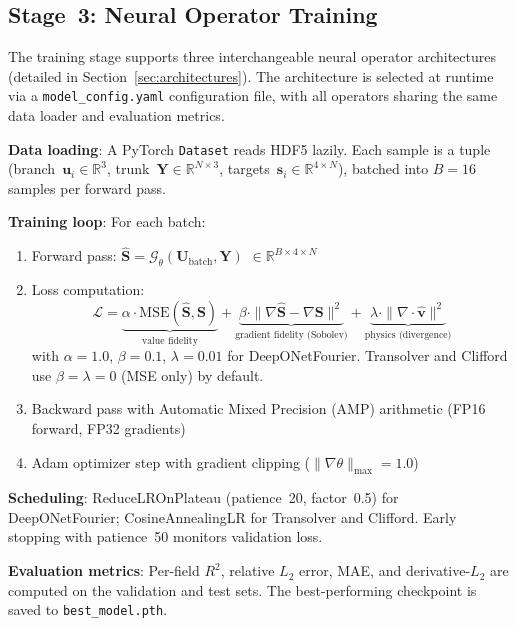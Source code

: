 \documentclass[journal]{IEEEtran}
\begin{document}
\subsection{Stage~3: Neural Operator Training}

The training stage supports three interchangeable neural operator architectures (detailed in Section~\ref{sec:architectures}). The architecture is selected at runtime via a \texttt{model\_config.yaml} configuration file, with all operators sharing the same data loader and evaluation metrics.

\textbf{Data loading}: A PyTorch \texttt{Dataset} reads HDF5 lazily. Each sample is a tuple (branch~$\bm{u}_i \in \mathbb{R}^3$, trunk~$\bm{Y} \in \mathbb{R}^{N \times 3}$, targets~$\bm{s}_i \in \mathbb{R}^{4 \times N}$), batched into $B = 16$ samples per forward pass.

\textbf{Training loop}: For each batch:
\begin{enumerate}
    \item Forward pass: $\hat{\bm{S}} = \mathcal{G}_\theta(\bm{U}_\text{batch}, \bm{Y})$ $\in \mathbb{R}^{B \times 4 \times N}$
    \item Loss computation:
    \begin{equation}
    \mathcal{L} = \underbrace{\alpha \cdot \text{MSE}(\hat{\bm{S}}, \bm{S})}_{\text{value fidelity}} + \underbrace{\beta \cdot \|\nabla\hat{\bm{S}} - \nabla\bm{S}\|^2}_{\text{gradient fidelity (Sobolev)}} + \underbrace{\lambda \cdot \|{\nabla \!\cdot\! \hat{\bm{v}}}\|^2}_{\text{physics (divergence)}}
    \label{eq:total_loss}
    \end{equation}
    with $\alpha = 1.0$, $\beta = 0.1$, $\lambda = 0.01$ for DeepONetFourier. Transolver and Clifford use $\beta = \lambda = 0$ (MSE only) by default.
    \item Backward pass with Automatic Mixed Precision (AMP) arithmetic (FP16 forward, FP32 gradients)
    \item Adam optimizer step with gradient clipping ($\|\nabla\theta\|_\text{max} = 1.0$)
\end{enumerate}

\textbf{Scheduling}: ReduceLROnPlateau (patience~20, factor~0.5) for DeepONetFourier; CosineAnnealingLR for Transolver and Clifford. Early stopping with patience~50 monitors validation loss.

\textbf{Evaluation metrics}: Per-field $R^2$, relative $L_2$ error, MAE, and derivative-$L_2$ are computed on the validation and test sets. The best-performing checkpoint is saved to \texttt{best\_model.pth}.
\end{document}
